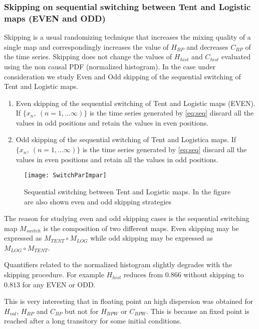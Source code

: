 \subsubsection{Skipping on sequential switching between Tent and Logistic maps (EVEN and ODD)} \label{sssec:switch}

Skipping is a usual randomizing technique that increases the mixing quality of a single map and correspondingly increases the value of $H_{BP}$ and decreases $C_{BP} $ of the time series.
Skipping does not change the values of $H_{hist}$ and $C_{hist}$ evaluated using the non causal PDF (normalized histogram)\cite{DeMicco2008}.
In the case under consideration we study Even and Odd skipping of the sequential switching of Tent and Logistic maps.


\begin{enumerate}
	\item Even skipping of the sequential switching of Tent and Logistic maps (EVEN).\\
	If $\{x_n,~(n=1,...\infty)\}$ is the time series generated by \ref{eq:seq} discard all the values in odd positions and retain the values in even positions.
	\item Odd skipping of the sequential switching of Tent and Logistica maps.
	If $\{x_n,~(n=1,...\infty)\}$ is the time series generated by \ref{eq:seq} discard all the values in even positions and retain all the values in odd positions.
\end{enumerate}

\begin{figure}
	\texttt{[image: SwitchParImpar]}
	\caption{Sequential switching between Tent and Logistic maps. In the figure are also shown even and odd skipping strategies} \label{fig:seq}
\end{figure}

The reason for studying even and odd skipping cases is the sequential switching map $M_{switch}$ is the composition of two different maps. Even skipping may be expressed as $M_{TENT}\circ M_{LOG}$ while odd skipping may be expressed as $M_{LOG}\circ M_{TENT}$.

Quantifiers related to the normalized histogram slightly degrades with the skipping procedure. For example $H_{hist}$ reduces from $0.866$ without skipping to $0.813$ for any EVEN or ODD. 

This is very interesting that in floating point an high dispersion was obtained for $H_{val}$, $H_{BP}$ and $C_{BP}$ but not for $H_{BPW}$ or $C_{BPW}$.
This is because an fixed point is reached after a long transitory for some initial conditions.

